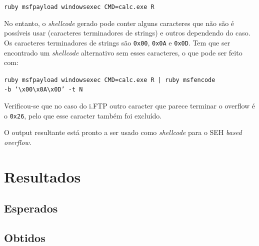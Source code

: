 \documentclass[a4paper]{article}
\begin{document}
	\texttt{ruby msfpayload windows\/exec CMD=calc.exe R}

No entanto, o \textit{shellcode} gerado pode conter alguns caracteres que não são é possíveis usar (caracteres terminadores de strings) e outros dependendo do caso. Os caracteres terminadores de strings são \texttt{0x00}, \texttt{0x0A} e \texttt{0x0D}. Tem que ser encontrado um \textit{shellcode} alternativo sem esses caracteres, o que pode ser feito com:

	\texttt{ruby msfpayload windows\/exec CMD=calc.exe R | ruby msfencode \\ -b `\textbackslash x00\textbackslash x0A\textbackslash x0D' -t N}

Verificou-se que no caso do i.FTP outro caracter que parece terminar o overflow é o \texttt{0x26}, pelo que esse caracter também foi excluído.

O output resultante está pronto a ser usado como \textit{shellcode} para o SEH \textit{based overflow}.


\pagebreak
\section{Resultados}

\subsection{Esperados}
\subsection{Obtidos}


\pagebreak

\nocite{CorelanTeam, refx86asm, genSEHexploits, AMD64vol3_2013}
\end{document}
